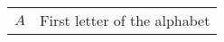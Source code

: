 \begin{table}[h]
    \begin{tabular}{@{}ll@{}}%
        \( A \) & First letter of the alphabet\\
    \end{tabular}
    \label{tab:glossar}
\end{table}